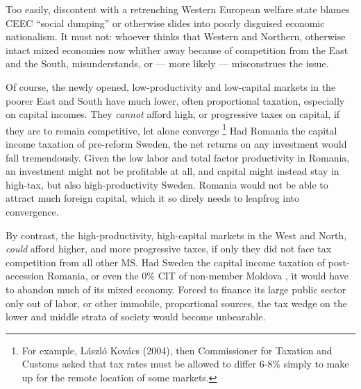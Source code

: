 \documentclass[11pt,a4paper,oneside,openright]{article}
\begin{document}




Too easily, discontent with a retrenching Western European welfare state blames \gls{CEEC} ``social dumping'' %
or otherwise slides into poorly disguised economic nationalism. 
It must not: 
whoever thinks that Western and Northern, otherwise intact mixed economies now whither away because of competition from the East and the South, misunderstands, or --- more likely --- misconstrues the issue.

Of course, the newly opened, low-productivity and low-capital markets in the poorer East and South have much lower, often proportional taxation, especially on capital incomes. 
They \emph{cannot} afford high, or progressive taxes on capital, if they are to remain competitive, let alone converge
\footnote{
	For example, L\'{a}szl\'{o} Kov\'{a}cs (2004), then Commissioner for Taxation and Customs asked that tax rates must be allowed to differ 6-8\% simply to make up for the remote location of some markets.
} 
Had Romania the capital income taxation of pre-reform Sweden, the net returns on any investment would fall tremendously. 
Given the low labor and total factor productivity in Romania, an investment might not be profitable at all, and capital might instead stay in high-tax, but also high-productivity Sweden. 
Romania would not be able to attract much foreign capital, which it so direly needs to leapfrog into convergence.
	
By contrast, the high-productivity, high-capital markets in the West and North, \emph{could} afford higher, and more progressive taxes, if only they did not face tax competition from all other \gls{MS}. 
Had Sweden the capital income taxation of post-accession Romania, or even the 0\% \gls{CIT} of non-member Moldova \citep{Piatkowski2008}, it would have to abandon much of its mixed economy. 
Forced to finance its large public sector only out of labor, or other immobile, proportional sources, the tax wedge on the lower and middle strata of society would become unbearable. 
\end{document}
